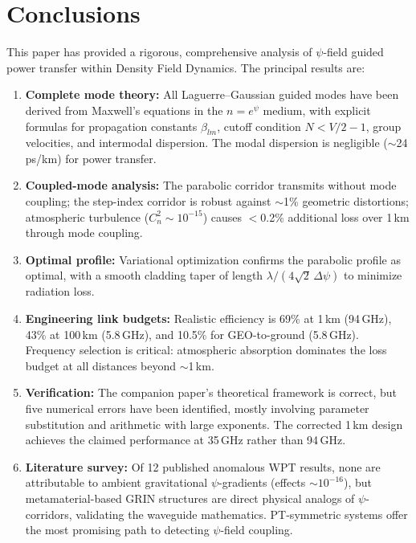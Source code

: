 \documentclass[journal,twocolumn]{IEEEtran}
\begin{document}
\section{Conclusions}\label{sec:conclusions}

This paper has provided a rigorous, comprehensive analysis of
$\psi$-field guided power transfer within Density Field Dynamics.
The principal results are:

\begin{enumerate}
\item \textbf{Complete mode theory:} All Laguerre--Gaussian guided modes
have been derived from Maxwell's equations in the $n = e^\psi$ medium,
with explicit formulas for propagation constants $\beta_{lm}$, cutoff
condition $N < V/2 - 1$, group velocities, and intermodal dispersion.
The modal dispersion is negligible ($\sim$24\,ps/km) for power transfer.

\item \textbf{Coupled-mode analysis:} The parabolic corridor transmits
without mode coupling; the step-index corridor is robust against
$\sim$1\% geometric distortions; atmospheric turbulence
($C_n^2 \sim 10^{-15}$) causes $<$0.2\% additional loss over 1\,km
through mode coupling.

\item \textbf{Optimal profile:} Variational optimization confirms the
parabolic profile as optimal, with a smooth cladding taper of length
$\lambda/(4\sqrt{2}\,\Delta\psi)$ to minimize radiation loss.

\item \textbf{Engineering link budgets:} Realistic efficiency is 69\%
at 1\,km (94\,GHz), 43\% at 100\,km (5.8\,GHz), and 10.5\% for
GEO-to-ground (5.8\,GHz). Frequency selection is critical: atmospheric
absorption dominates the loss budget at all distances beyond $\sim$1\,km.

\item \textbf{Verification:} The companion paper's theoretical framework
is correct, but five numerical errors have been identified, mostly
involving parameter substitution and arithmetic with large exponents.
The corrected 1\,km design achieves the claimed performance at 35\,GHz
rather than 94\,GHz.

\item \textbf{Literature survey:} Of 12 published anomalous WPT results,
none are attributable to ambient gravitational $\psi$-gradients (effects
$\sim 10^{-16}$), but metamaterial-based GRIN structures are direct
physical analogs of $\psi$-corridors, validating the waveguide
mathematics. PT-symmetric systems offer the most promising path to
detecting $\psi$-field coupling.
\end{enumerate}
\end{document}
